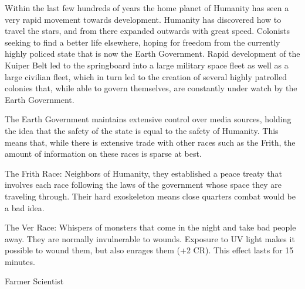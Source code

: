 \documentclass[blue]{guildcamp4}
\begin{document}
\name{\bEarth{}}

Within the last few hundreds of years the home planet of Humanity has seen a very rapid movement towards development. Humanity has discovered how to travel the stars, and from there expanded outwards with great speed. Colonists seeking to find a better life elsewhere, hoping for freedom from the currently highly policed state that is now the Earth Government. Rapid development of the Kuiper Belt led to the springboard into a large military space fleet as well as a large civilian fleet, which in turn led to the creation of several highly patrolled colonies that, while able to govern themselves, are constantly under watch by the Earth Government.

The Earth Government maintains extensive control over media sources, holding the idea that the safety of the state is equal to the safety of Humanity. This means that, while there is extensive trade with other races such as the Frith, the amount of information on these races is sparse at best.

The Frith Race: Neighbors of Humanity, they established a peace treaty that involves each race following the laws of the government whose space they are traveling through. Their hard exoskeleton means close quarters combat would be a bad idea.

The Ver Race: Whispers of monsters that come in the night and take bad people away. They are normally invulnerable to wounds. Exposure to UV light makes it possible to wound them, but also enrages them (+2 CR). This effect lasts for 15 minutes.


\begin{members}
	\member{\cPlead{}} Farmer
	\member{\cSpite{}} Scientist

\end{members}
\end{document}
